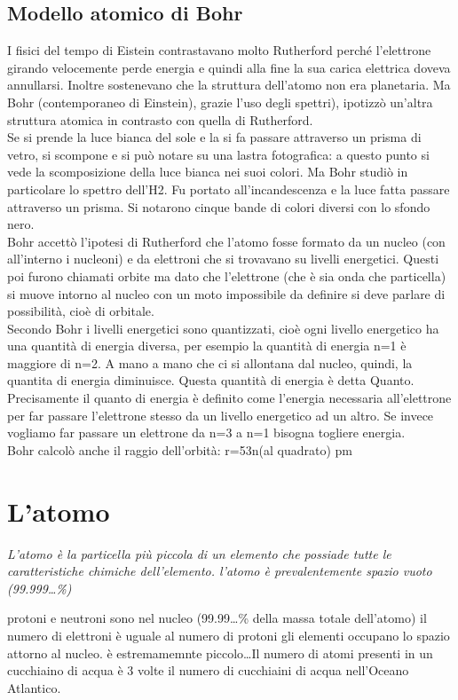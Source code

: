 \subsection{Modello atomico di Bohr}
\label{sec:bohr}
\begin{defi}
  I fisici del tempo di Eistein contrastavano molto Rutherford perché l’elettrone girando velocemente perde energia e quindi alla fine la sua carica elettrica doveva annullarsi. Inoltre sostenevano che la struttura dell’atomo non era planetaria. Ma Bohr (contemporaneo di Einstein), grazie l’uso degli spettri), ipotizzò un’altra struttura atomica in contrasto con quella di Rutherford.\\
Se si prende la luce bianca del sole e la si fa passare attraverso un prisma di vetro, si scompone e si può notare su una lastra fotografica: a questo punto si vede la scomposizione della luce bianca nei suoi colori. Ma Bohr studiò in particolare lo spettro dell’H2. Fu portato all’incandescenza e la luce fatta passare attraverso un prisma. Si notarono cinque bande di colori diversi con lo sfondo nero.\\
Bohr accettò l’ipotesi di Rutherford che l’atomo fosse formato da un nucleo (con all’interno i nucleoni) e da elettroni che si trovavano su livelli energetici. Questi poi furono chiamati orbite ma dato che l’elettrone (che è sia onda che particella) si muove intorno al nucleo con un moto impossibile da definire si deve parlare di possibilità, cioè di orbitale.\\
Secondo Bohr i livelli energetici sono quantizzati, cioè ogni livello energetico ha una quantità di energia diversa, per esempio la quantità di energia n=1 è maggiore di n=2. A mano a mano che ci si allontana dal nucleo, quindi, la quantita di energia diminuisce. Questa quantità di energia è detta Quanto. Precisamente il quanto di energia è definito come l’energia necessaria all’elettrone per far passare l’elettrone stesso da un livello energetico ad un altro. Se invece vogliamo far passare un elettrone da n=3 a n=1 bisogna togliere energia.\\
Bohr calcolò anche il raggio dell’orbità: r=53n(al quadrato) pm
\end{defi}

\section{L'atomo}
\label{sec:l'atomo}
\textit{L'atomo è la particella più piccola di un elemento che possiade tutte le caratteristiche chimiche
  dell'elemento. l'atomo è prevalentemente spazio vuoto (99.999\dots\%)}
\begin{tasks}
  \task protoni e neutroni sono nel nucleo (99.99\dots\% della massa totale dell'atomo)
  \task il numero di elettroni è uguale al numero di protoni
  \task gli elementi occupano lo spazio attorno al nucleo.
  \task è estremamemnte piccolo\dots Il numero di atomi presenti in un cucchiaino di acqua è 3 volte il numero di
  cucchiaini di acqua nell'Oceano Atlantico.
\end{tasks}

